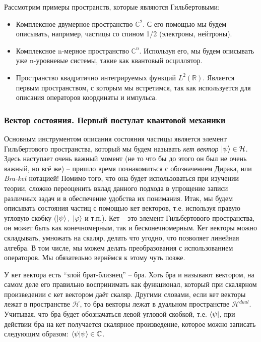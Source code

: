 Рассмотрим примеры пространств, которые являются Гильбертовыми: 
\begin{itemize}
    \item Комплексное двумерное пространство $\mathbb{C}^2$. С его помощью мы будем описывать, например, частицы со спином 1/2 (электроны, нейтроны).
    \item Комплексное n-мерное пространство $\mathbb{C}^n$. Используя его, мы будем описывать уже n-уровневые системы, такие как квантовый осциллятор.
    \item Пространство квадратично интегрируемых функций $L^2(\mathbb{R})$. Является первым пространством, с которым мы встретимся, так как используется для описания операторов координаты и импульса.
\end{itemize}

\subsubsection*{Вектор состояния. Первый постулат квантовой механики}
\hspace{1em} Основным инструментом описания состояния частицы является элемент Гильбертового пространства, который мы будем называть \textit{кет вектор} $\ket{\psi} \in \mathcal{H}$. Здесь наступает очень важный момент (не то что бы до этого он был не очень важный, но всё же) -- пришло время познакомиться с обозначением Дирака, или \textit{Bra-ket} нотацией! Помимо того, что она будет использоваться при изучении теории, сложно переоценить вклад данного подхода в упрощение записи различных задач и в обеспечение удобства их понимания. Итак, мы будем описывать состояния частиц с помощью кет векторов, т.е. используя правую угловую скобку ($\ket{\psi}, \; \ket{\varphi}$ и т.п.). Кет -- это элемент Гильбертового пространства, он может быть как конечномерным, так и бесконечномерным. Кет векторы можно складывать, умножать на скаляр, делать что угодно, что позволяет линейная алгебра. В том числе, мы можем делать преобразования с использованием операторов. Мы обязательно вернёмся к этому чуть позже. 

У кет вектора есть ``злой брат-близнец'' -- бра. Хоть бра и называют вектором, на самом деле его правильно воспринимать как функционал, который при скалярном произведении с кет вектором даёт скаляр. Другими словами, если кет векторы лежат в пространстве $\mathcal{H}$, то бра векторы лежат в дуальном пространстве $\mathcal{H}^{dual}$. Учитывая, что бра будет обозначаться левой угловой скобкой, т.е. $\bra{\psi}$, при действии бра на кет получается скалярное произведение, которое можно записать следующим образом: $\bra{\psi}\ket{\psi} \in \mathbb{C}$. 

